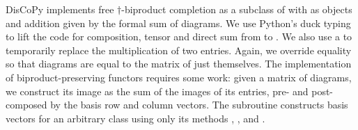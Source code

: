 DisCoPy implements free $\dagger$-biproduct completion as a subclass of  with  as objects and addition given by the formal sum of diagrams.
We use Python's duck typing to lift the code for composition, tensor and direct sum from  to .
We also use a  to temporarily replace the multiplication of two  entries.
Again, we override equality so that diagrams are equal to the matrix of just themselves.
The implementation of biproduct-preserving functors requires some work: given a matrix of diagrams, we construct its image as the sum of the images of its entries, pre- and post-composed by the basis row and column vectors.
The  subroutine constructs basis vectors for an arbitrary class using only its methods , ,  and .

